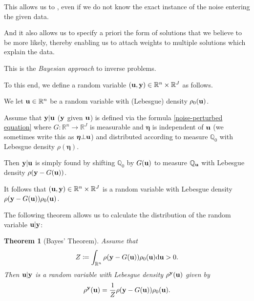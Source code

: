 \documentclass[oneside]{article}
\numberwithin{equation}{section}
\newtheorem{theorem}{Theorem}[section]
\begin{document}
This allows us to , even if we do not know the exact instance of the noise entering the given data.

And it also allows us to specify a priori the form of solutions that we believe to be more likely, thereby enabling us to attach weights to multiple solutions which explain the data.

This is the \textit{Bayesian approach} to inverse problems.

%
To this end, we define a random variable $({\bf u},{\bf y})\in\mathbb{R}^n\times\mathbb{R}^J$ as follows.

We let ${\bf u}\in\mathbb{R}^n$ be a random variable with (Lebesgue) density $\rho_0({\bf u})$.

Assume that ${\bf y}|{\bf u}$ (${\bf y}$ given ${\bf u}$) is defined via the formula \eqref{noise-perturbed equation} where $G:\mathbb{R}^n\to\mathbb{R}^J$ is measurable and $\boldsymbol{\eta}$ is independent of ${\bf u}$ (we sometimes write this as $\boldsymbol{\eta}\bot{\bf u}$) and distributed according to measure $\mathbb{Q}_0$ with Lebesgue density $\rho(\boldsymbol{\eta})$.

Then ${\bf y}|{\bf u}$ is simply found by shifting $\mathbb{Q}_0$ by $G({\bf u})$ to measure $\mathbb{Q}_{\bf u}$ with Lebesgue density $\rho({\bf y} - G({\bf u}))$.

It follows that $({\bf u},{\bf y})\in\mathbb{R}^n\times\mathbb{R}^J$ is a random variable with Lebesgue density $\rho({\bf y} - G({\bf u}))\rho_0({\bf u})$.

%
The following theorem allows us to calculate the distribution of the random variable ${\bf u}|{\bf y}$:

\begin{theorem}[Bayes' Theorem]
    \label{Bayes' theorem}
    Assume that
    \begin{align*}
        Z\coloneqq\int_{\mathbb{R}^n} \rho({\bf y} - G({\bf u}))\rho_0({\bf u}){\rm d}{\bf u} > 0.
    \end{align*}
    Then ${\bf u}|{\bf y}$ is a random variable with Lebesgue density $\rho^{\bf y}({\bf u})$ given by
    \begin{align*}
        \rho^{\bf y}({\bf u}) = \frac{1}{Z}\rho({\bf y} - G({\bf u}))\rho_0({\bf u}).
    \end{align*}
\end{theorem}
\end{document}
